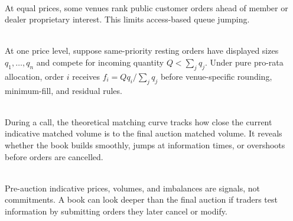 \begin{marketrule} \\
At equal prices, some venues rank public customer orders ahead of member or dealer proprietary interest. This limits access-based queue jumping.
\end{marketrule}

\begin{model} \\
At one price level, suppose same-priority resting orders have displayed sizes $q_1,\ldots,q_n$ and compete for incoming quantity $Q<\sum\limits_j q_j$. Under pure pro-rata allocation, order $i$ receives $f_i=Qq_i/\sum\limits_j q_j$ before venue-specific rounding, minimum-fill, and residual rules.
\end{model}

\begin{definition} \\
During a call, the theoretical matching curve tracks how close the current indicative matched volume is to the final auction matched volume. It reveals whether the book builds smoothly, jumps at information times, or overshoots before orders are cancelled.
\end{definition}

\begin{caveat} \\
Pre-auction indicative prices, volumes, and imbalances are signals, not commitments. A book can look deeper than the final auction if traders test information by submitting orders they later cancel or modify.
\end{caveat}
